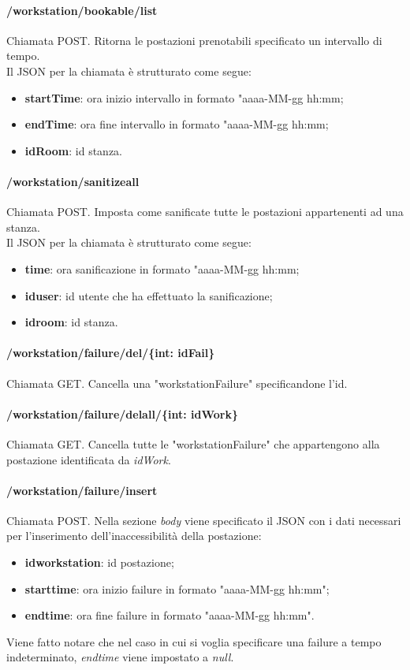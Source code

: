 \paragraph{/workstation/bookable/list}
Chiamata POST. Ritorna le postazioni prenotabili specificato un intervallo di tempo.\\
Il JSON per la chiamata è strutturato come segue:
\begin{itemize}
	\item \textbf{startTime}: ora inizio intervallo in formato "aaaa-MM-gg hh:mm;
	\item \textbf{endTime}: ora fine intervallo in formato "aaaa-MM-gg hh:mm;
	\item \textbf{idRoom}: id stanza.
\end{itemize}
\paragraph{/workstation/sanitizeall}
Chiamata POST. Imposta come sanificate tutte le postazioni appartenenti ad una stanza.\\
Il JSON per la chiamata è strutturato come segue:
\begin{itemize}
	\item \textbf{time}: ora sanificazione in formato "aaaa-MM-gg hh:mm;
	\item \textbf{iduser}: id utente che ha effettuato la sanificazione;
	\item \textbf{idroom}: id stanza.
\end{itemize}
\paragraph{/workstation/failure/del/\{int: idFail\}}
Chiamata GET. Cancella una "workstationFailure" specificandone l'id.
\paragraph{/workstation/failure/delall/\{int: idWork\}}
Chiamata GET. Cancella tutte le "workstationFailure" che appartengono alla postazione identificata da \textit{idWork}.
\paragraph{/workstation/failure/insert}
Chiamata POST. Nella sezione \textit{body} viene specificato il JSON con i dati necessari per l'inserimento dell'inaccessibilità della postazione:
\begin{itemize}
	\item \textbf{idworkstation}: id postazione;
	\item \textbf{starttime}: ora inizio failure in formato "aaaa-MM-gg hh:mm";
	\item \textbf{endtime}: ora fine failure in formato "aaaa-MM-gg hh:mm".
\end{itemize}
Viene fatto notare che nel caso in cui si voglia specificare una failure a tempo indeterminato, \textit{endtime} viene impostato a \textit{null}.
